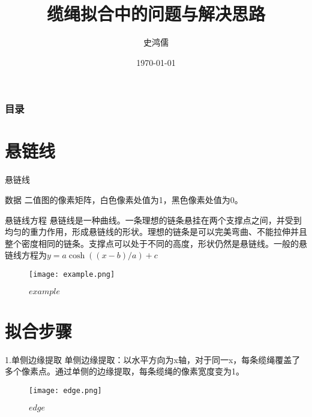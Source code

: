 \documentclass[10pt]{beamer}
\title{缆绳拟合中的问题与解决思路}
\subtitle{}
\author{史鸿儒}
\date{\today}
\begin{document}
\thispagestyle{empty}	%
\maketitle

	\begin{frame}           %
	\addtocounter{framenumber}{-2}%
	\frametitle{目录}
	\thispagestyle{empty}
	\tableofcontents        %
	\end{frame}




\section{悬链线}
\begin{frame}{悬链线}

\begin{block}{数据}
二值图的像素矩阵，白色像素处值为1，黑色像素处值为0。
\end{block}

\begin{block}{悬链线方程}
悬链线是一种曲线。一条理想的链条悬挂在两个支撑点之间，并受到均匀的重力作用，形成悬链线的形状。理想的链条是可以完美弯曲、不能拉伸并且整个密度相同的链条。支撑点可以处于不同的高度，形状仍然是悬链线。一般的悬链线方程为\(y = a \cosh((x-b)/a) + c\)
\end{block}
\begin{figure}
  \centerline{\texttt{[image: example.png]}}
  \caption{$example$}
\end{figure}

\end{frame}

\section{拟合步骤}
\begin{frame}{1.单侧边缘提取}
单侧边缘提取：以水平方向为x轴，对于同一x，每条缆绳覆盖了多个像素点。通过单侧的边缘提取，每条缆绳的像素宽度变为1。
\begin{figure}
  \centerline{\texttt{[image: edge.png]}}
  \caption{$edge$}
\end{figure}

\end{frame}
\end{document}

